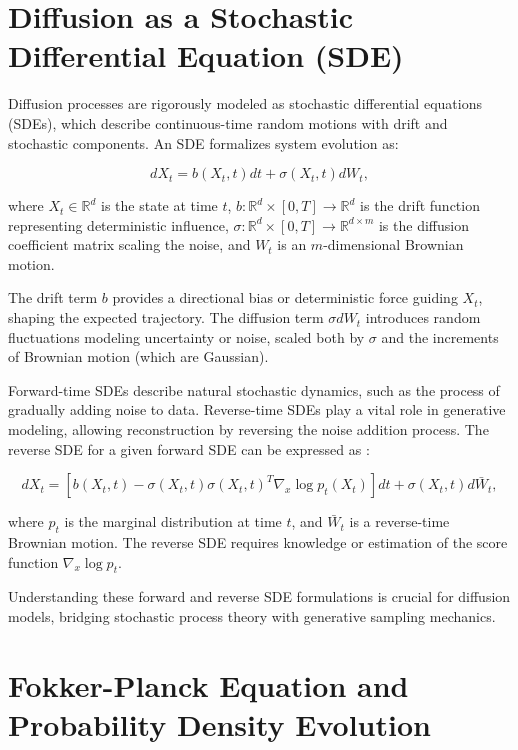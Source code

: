 \documentclass[a4paper,12pt,oneside]{memoir}
\begin{document}
\section{Diffusion as a Stochastic Differential Equation (SDE)}

Diffusion processes are rigorously modeled as stochastic differential equations (SDEs), which describe continuous-time random motions with drift and stochastic components. An SDE formalizes system evolution as:

\[
dX_t = b(X_t, t) dt + \sigma(X_t, t) dW_t,
\]

where \( X_t \in \mathbb{R}^d \) is the state at time \( t \), \( b: \mathbb{R}^d \times [0,T] \to \mathbb{R}^d \) is the drift function representing deterministic influence, \( \sigma: \mathbb{R}^d \times [0,T] \to \mathbb{R}^{d \times m} \) is the diffusion coefficient matrix scaling the noise, and \( W_t \) is an \( m \)-dimensional Brownian motion.

The drift term \( b \) provides a directional bias or deterministic force guiding \( X_t \), shaping the expected trajectory. The diffusion term \( \sigma dW_t \) introduces random fluctuations modeling uncertainty or noise, scaled both by \( \sigma \) and the increments of Brownian motion (which are Gaussian).

Forward-time SDEs describe natural stochastic dynamics, such as the process of gradually adding noise to data. Reverse-time SDEs play a vital role in generative modeling, allowing reconstruction by reversing the noise addition process. The reverse SDE for a given forward SDE can be expressed as \cite{Anderson1982,Chen2021}:

\[
dX_t = \left[ b(X_t, t) - \sigma(X_t, t) \sigma(X_t, t)^T \nabla_x \log p_t(X_t) \right]dt + \sigma(X_t, t) d\bar{W}_t,
\]

where \( p_t \) is the marginal distribution at time \( t \), and \( \bar{W}_t \) is a reverse-time Brownian motion. The reverse SDE requires knowledge or estimation of the score function \( \nabla_x \log p_t \).

Understanding these forward and reverse SDE formulations is crucial for diffusion models, bridging stochastic process theory with generative sampling mechanics.

\section{Fokker-Planck Equation and Probability Density Evolution}
\end{document}
